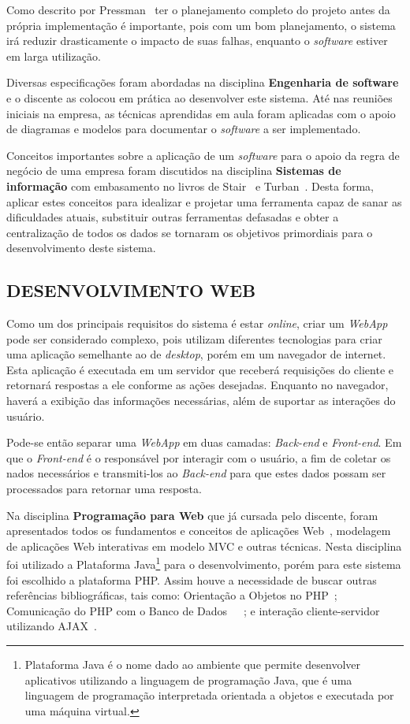 \documentclass[
  12pt,				%
  openany,
  oneside,
  a4paper,			%
  english,			%
  brazil
]{article}
\numberwithin{figure}{section}
\numberwithin{table}{section}
\begin{document}
Como descrito por Pressman~\cite{pressman} ter o planejamento completo do projeto antes da própria implementação é importante, pois com um bom planejamento, o sistema irá reduzir drasticamente o impacto de suas falhas, enquanto o \textit{software} estiver em larga utilização.

Diversas especificações foram abordadas na disciplina \textbf{Engenharia de software} e o discente as colocou em prática ao desenvolver este sistema. Até nas reuniões iniciais na empresa, as técnicas aprendidas em aula foram aplicadas com o apoio de diagramas e modelos para documentar o \textit{software} a ser implementado.

Conceitos importantes sobre a aplicação de um \textit{software} para o apoio da regra de negócio de uma empresa foram discutidos na disciplina \textbf{Sistemas de informação} com embasamento no livros de Stair~\cite{SI_principios} e Turban~\cite{SI_turban}. Desta forma, aplicar estes conceitos para idealizar e projetar uma ferramenta capaz de sanar as dificuldades atuais, substituir outras ferramentas defasadas e obter a centralização de todos os dados se tornaram os objetivos primordiais para o desenvolvimento deste sistema.

\subsection{DESENVOLVIMENTO WEB}
Como um dos principais requisitos do sistema é estar \textit{online}, criar um \textit{WebApp} pode ser considerado complexo, pois utilizam diferentes tecnologias para criar uma aplicação semelhante ao de \textit{desktop}, porém em um navegador de internet. Esta aplicação é executada em um servidor que receberá requisições do cliente e retornará respostas a ele conforme as ações desejadas. Enquanto no navegador, haverá a exibição das informações necessárias, além de suportar as interações do usuário.

Pode-se então separar uma \textit{WebApp} em duas camadas: \textit{Back-end} e \textit{Front-end}. Em que o \textit{Front-end} é o responsável por interagir com o usuário, a fim de coletar os nados necessários e transmiti-los ao \textit{Back-end} para que estes dados possam ser processados para retornar uma resposta.

Na disciplina \textbf{Programação para Web} que já cursada pelo discente, foram apresentados todos os fundamentos e conceitos de aplicações Web~\cite{pWeb_sebesta}, modelagem de aplicações Web interativas em modelo MVC e outras técnicas. Nesta disciplina foi utilizado a Plataforma Java\footnote{Plataforma Java é o nome dado ao ambiente que permite desenvolver aplicativos utilizando a linguagem de programação Java, que é uma linguagem de programação interpretada orientada a objetos e executada por uma máquina virtual.} para o desenvolvimento, porém para este sistema foi escolhido a plataforma PHP. Assim houve a necessidade de buscar outras referências bibliográficas, tais como: Orientação a Objetos no PHP~\cite{PHP_Novatec_poo}; Comunicação do PHP com o Banco de Dados~\cite{PHP_Novatec_dev}~\cite{PHP_Novatec_appWeb}~\cite{PHP_mysql}; e interação cliente-servidor utilizando AJAX~\cite{PHP_Novatec_ajax}.
\end{document}
